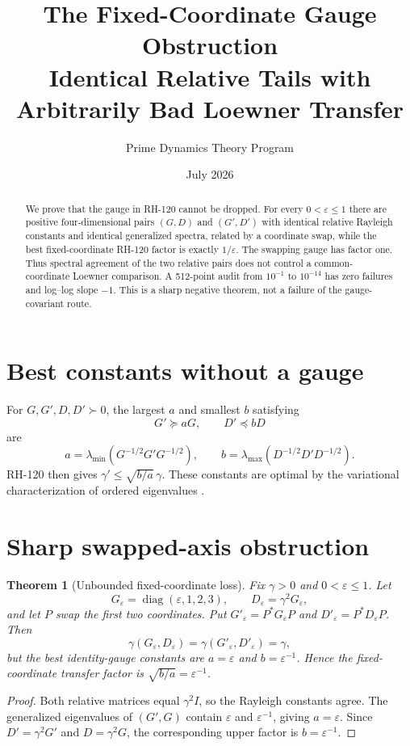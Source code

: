 \documentclass[12pt]{article}
\title{The Fixed-Coordinate Gauge Obstruction\\\large Identical Relative Tails with Arbitrarily Bad Loewner Transfer}
\author{Prime Dynamics Theory Program}\date{July 2026}
\newtheorem{theorem}{Theorem}\newtheorem{corollary}[theorem]{Corollary}
\begin{document}
\maketitle
\begin{abstract}
We prove that the gauge in RH-120 cannot be dropped.  For every
$0<\varepsilon\leq1$ there are positive four-dimensional pairs $(G,D)$ and
$(G',D')$ with identical relative Rayleigh constants and identical
generalized spectra, related by a coordinate swap, while the best
fixed-coordinate RH-120 factor is exactly $1/\varepsilon$.  The swapping
gauge has factor one.  Thus spectral agreement of the two relative pairs
does not control a common-coordinate Loewner comparison.  A 512-point audit
from $10^{-1}$ to $10^{-14}$ has zero failures and log--log slope $-1$.
This is a sharp negative theorem, not a failure of the gauge-covariant route.
\end{abstract}

\section{Best constants without a gauge}
For $G,G',D,D'\succ0$, the largest $a$ and smallest $b$ satisfying
\[
 G'\succeq aG,\qquad D'\preceq bD
\]
are
\[
 a=\lambda_{\min}(G^{-1/2}G'G^{-1/2}),\qquad
 b=\lambda_{\max}(D^{-1/2}D'D^{-1/2}).
\]
RH-120 then gives $\gamma'\leq\sqrt{b/a}\,\gamma$.  These constants are
optimal by the variational characterization of ordered eigenvalues
\citep{Bhatia2007,HornJohnson1991}.

\section{Sharp swapped-axis obstruction}
\begin{theorem}[Unbounded fixed-coordinate loss]\label{thm:swap}
Fix $\gamma>0$ and $0<\varepsilon\leq1$.  Let
\[
 G_\varepsilon=\operatorname{diag}(\varepsilon,1,2,3),\qquad
 D_\varepsilon=\gamma^2G_\varepsilon,
\]
and let $P$ swap the first two coordinates.  Put
$G'_\varepsilon=P^*G_\varepsilon P$ and
$D'_\varepsilon=P^*D_\varepsilon P$.  Then
\[
 \gamma(G_\varepsilon,D_\varepsilon)
 =\gamma(G'_\varepsilon,D'_\varepsilon)=\gamma,
\]
but the best identity-gauge constants are $a=\varepsilon$ and
$b=\varepsilon^{-1}$.  Hence the fixed-coordinate transfer factor is
$\sqrt{b/a}=\varepsilon^{-1}$.
\end{theorem}
\begin{proof}
Both relative matrices equal $\gamma^2I$, so the Rayleigh constants agree.
The generalized eigenvalues of $(G',G)$ contain $\varepsilon$ and
$\varepsilon^{-1}$, giving $a=\varepsilon$.  Since $D'=\gamma^2G'$ and
$D=\gamma^2G$, the corresponding upper factor is $b=\varepsilon^{-1}$.
\end{proof}
\end{document}
